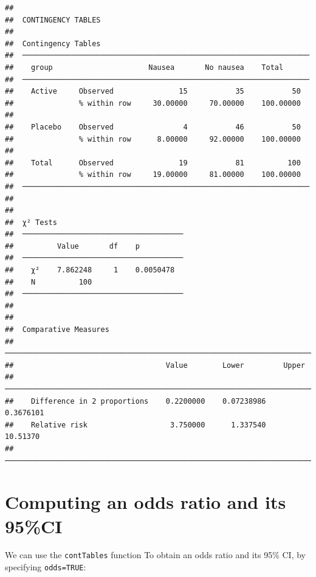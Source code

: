 \documentclass[
]{memoir}
\begin{document}
\begin{verbatim}
## 
##  CONTINGENCY TABLES
## 
##  Contingency Tables                                                 
##  ────────────────────────────────────────────────────────────────── 
##    group                      Nausea       No nausea    Total       
##  ────────────────────────────────────────────────────────────────── 
##    Active     Observed               15           35           50   
##               % within row     30.00000     70.00000    100.00000   
##                                                                     
##    Placebo    Observed                4           46           50   
##               % within row      8.00000     92.00000    100.00000   
##                                                                     
##    Total      Observed               19           81          100   
##               % within row     19.00000     81.00000    100.00000   
##  ────────────────────────────────────────────────────────────────── 
## 
## 
##  χ² Tests                              
##  ───────────────────────────────────── 
##          Value       df    p           
##  ───────────────────────────────────── 
##    χ²    7.862248     1    0.0050478   
##    N          100                      
##  ───────────────────────────────────── 
## 
## 
##  Comparative Measures                                                    
##  ─────────────────────────────────────────────────────────────────────── 
##                                   Value        Lower         Upper       
##  ─────────────────────────────────────────────────────────────────────── 
##    Difference in 2 proportions    0.2200000    0.07238986    0.3676101   
##    Relative risk                   3.750000      1.337540     10.51370   
##  ───────────────────────────────────────────────────────────────────────
\end{verbatim}

\hypertarget{computing-an-odds-ratio-and-its-95ci}{%
\section{Computing an odds ratio and its 95\%CI}\label{computing-an-odds-ratio-and-its-95ci}}

We can use the \texttt{contTables} function To obtain an odds ratio and its 95\% CI, by specifying \texttt{odds=TRUE}:
\end{document}
